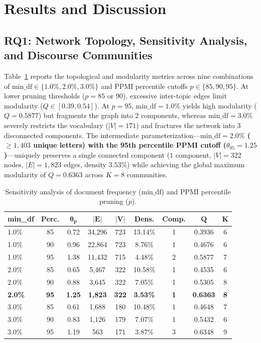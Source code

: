 \documentclass[pdflatex,sn-mathphys,iicol]{sn-jnl}
\begin{document}
\section{Results and Discussion}\label{sec4}
\subsection{RQ1: Network Topology, Sensitivity Analysis, and Discourse Communities}
Table~\ref{tab:sensitivity} reports the topological and modularity metrics across nine combinations of $\text{min\_df} \in \{1.0\%, 2.0\%, 3.0\%\}$ and PPMI percentile cutoffs $p \in \{85, 90, 95\}$. At lower pruning thresholds ($p=85$ or $90$), excessive inter-topic edges limit modularity ($Q \in [0.39, 0.54]$). At $p=95$, $\text{min\_df}=1.0\%$ yields high modularity ($Q=0.5877$) but fragments the graph into $2$ components, whereas $\text{min\_df}=3.0\%$ severely restricts the vocabulary ($|V|=171$) and fractures the network into $3$ disconnected components. The intermediate parameterization---\textbf{$\text{min\_df}=2.0\%$ ($\ge 1,403$ unique letters) with the 95th percentile PPMI cutoff ($\theta_{95}=1.25$)}---uniquely preserves a single connected component ($1$ component, $|V|=322$ nodes, $|E|=1,823$ edges, density $3.53\%$) while achieving the global maximum modularity of \textbf{$Q = 0.6363$} across $K=8$ communities.

\begin{table}[t]
\caption{Sensitivity analysis of document frequency ($\text{min\_df}$) and PPMI percentile pruning ($p$).}\label{tab:sensitivity}
\centering
\footnotesize
\setlength{\tabcolsep}{8pt}
\renewcommand{\arraystretch}{1.15}
\begin{tabular}{@{}lcccccccc@{}}
\toprule
\textbf{min\_df} & \textbf{Perc.} & $\boldsymbol{\theta_p}$ & $\boldsymbol{|E|}$ & $\boldsymbol{|V|}$ & \textbf{Dens.} & \textbf{Comp.} & $\boldsymbol{Q}$ & $\boldsymbol{K}$ \\
\midrule
1.0\% & 85 & 0.72 & 34,296 & 723 & 13.14\% & 1 & 0.3936 & 6 \\
1.0\% & 90 & 0.96 & 22,864 & 723 & 8.76\%  & 1 & 0.4676 & 6 \\
1.0\% & 95 & 1.38 & 11,432 & 715 & 4.48\%  & 2 & 0.5877 & 7 \\
\midrule
2.0\% & 85 & 0.65 & 5,467 & 322 & 10.58\% & 1 & 0.4535 & 6 \\
2.0\% & 90 & 0.88 & 3,645 & 322 & 7.05\%  & 1 & 0.5305 & 8 \\
\textbf{2.0\%} & \textbf{95} & \textbf{1.25} & \textbf{1,823} & \textbf{322} & \textbf{3.53\%} & \textbf{1} & \textbf{0.6363} & \textbf{8} \\
\midrule
3.0\% & 85 & 0.61 & 1,688 & 180 & 10.48\% & 1 & 0.4648 & 7 \\
3.0\% & 90 & 0.83 & 1,126 & 179 & 7.07\%  & 1 & 0.5432 & 6 \\
3.0\% & 95 & 1.19 & 563 & 171 & 3.87\%  & 3 & 0.6348 & 9 \\
\bottomrule
\end{tabular}
\end{table}
\end{document}
